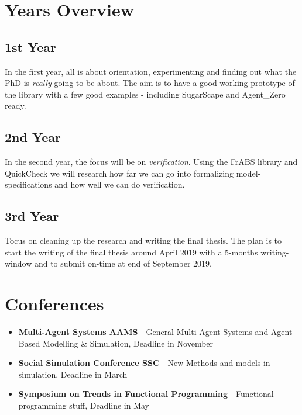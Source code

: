 \section{Years Overview}

\subsection{1st Year}
In the first year, all is about orientation, experimenting and finding out what the PhD is \textit{really} going to be about. The aim is to have a good working prototype of the library with a few good examples - including SugarScape and Agent\_Zero ready. 

\subsection{2nd Year}
In the second year, the focus will be on \textit{verification}. Using the FrABS library and QuickCheck we will research how far we can go into formalizing model-specifications and how well we can do verification. 

\subsection{3rd Year}
Tocus on cleaning up the research and writing the final thesis. The plan is to start the writing of the final thesis around April 2019 with a 5-months writing-window and to submit on-time at end of September 2019.

\section{Conferences}
\begin{itemize}
	\item \textbf{Multi-Agent Systems AAMS} - General Multi-Agent Systems and Agent-Based Modelling \& Simulation, Deadline in November
	\item \textbf{Social Simulation Conference SSC} - New Methods and models in simulation, Deadline in March
	\item \textbf{Symposium on Trends in Functional Programming} - Functional programming stuff, Deadline in May
\end{itemize}

